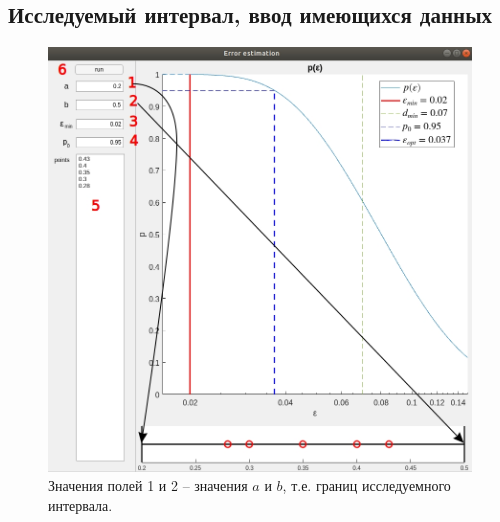 \documentclass[a4paper,12pt]{article} %
\begin{document}
\subsection{Исследуемый интервал, ввод имеющихся данных}

\begin{figure}[h!]
\begin{center}
\includegraphics[width=1\textwidth]{./pics/whole_window_interval}
\end{center}
\caption{Значения полей 1 и 2 -- значения $a$ и $b$, т.е. границ исследуемного интервала.} \label{img:whole_interval}
\end{figure}

\newpage
\end{document}
